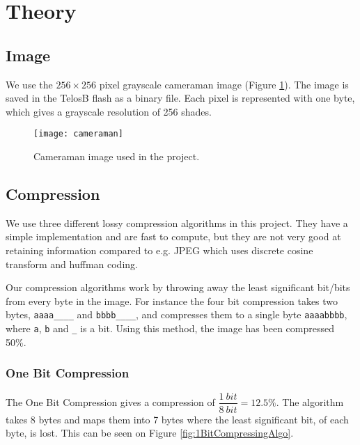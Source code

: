 \section{Theory}

\subsection{Image}
We use the $256 \times 256$ pixel grayscale cameraman image (Figure \ref{fig:image_cameraman}). The image is saved in the TelosB flash as a binary file. Each pixel is represented with one byte, which gives a grayscale resolution of 256 shades.

\begin{figure}[ht!]
\centering
\texttt{[image: cameraman]}
\caption{Cameraman image used in the project.}
\label{fig:image_cameraman}
\end{figure}

\subsection{Compression}

We use three different lossy compression algorithms in this project.
They have a simple implementation and are fast to compute, but they are not very good at retaining information compared to e.g. JPEG which uses discrete cosine transform and huffman coding.

Our compression algorithms work by throwing away the least significant bit/bits from every byte in the image.
For instance the four bit compression takes two bytes, \texttt{aaaa\_\_\_\_} and \texttt{bbbb\_\_\_\_}, and compresses them to a single byte \texttt{aaaabbbb}, where \texttt{a}, \texttt{b} and \texttt{\_} is a bit. Using this method, the image has been compressed 50\%.


\subsubsection{One Bit Compression} %
\label{sub:one_bit_compression}
\FloatBarrier

The One Bit Compression gives a compression of $\dfrac{1\ bit}{8\ bit} = 12.5\%$.
The algorithm takes 8 bytes and maps them into 7 bytes where the least significant bit, of each byte, is lost.
This can be seen on Figure \ref{fig:1BitCompressingAlgo}.


